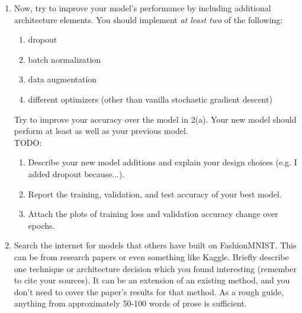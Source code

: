 \documentclass[a4paper]{article}
\begin{document}
\begin{enumerate}
\begin{enumerate}
			 TODO:
			 \begin{enumerate}
			 	\item \textbf{Briefly} describe your architecture in your report and explain your design choices (e.g. I used ReLU activation because...)  \textbf{Please design the network architecture by yourself. This is not about performance.} 
				\item Report the train, validation, and test accuracy of your best model (e.g. if the best model was obtained at epoch 50, report the train, validation, and test accuracy at epoch 50). 
				\item Attach the plots of training loss and validation accuracy change over epochs.  
			 \end{enumerate}
			 	Note: If you achieve more than 85\% accuracy on the test set, move on to the next subproblem.
			\item Now, try to improve your model's performance by including additional architecture elements. You should implement \emph{at least two} of the following:
			\begin{enumerate}
			    \item dropout
			    \item batch normalization
			    \item data augmentation
			    \item different optimizers (other than vanilla stochastic gradient descent)
			\end{enumerate}
			Try to improve your accuracy over the model in 2(a). Your new model should perform at least as well as your previous model.\\ 
			TODO: 
			\begin{enumerate}
				\item Describe your new model additions and explain your design choices (e.g. I added dropout because...). 
				\item Report the training, validation, and test accuracy of your best model. 
				\item Attach the plots of training loss and validation accuracy change over epochs. 
			\end{enumerate}
			\item Search the internet for models that others have built on FashionMNIST. This can be from research papers or even something like Kaggle. Briefly describe one technique or architecture decision which you found interesting (remember to cite your sources). It can be an extension of an existing method, and you don't need to cover the paper's results for that method. As a rough guide, anything from approximately 50-100 words of prose is sufficient.
		\end{enumerate}
	\end{enumerate}
\end{document}
